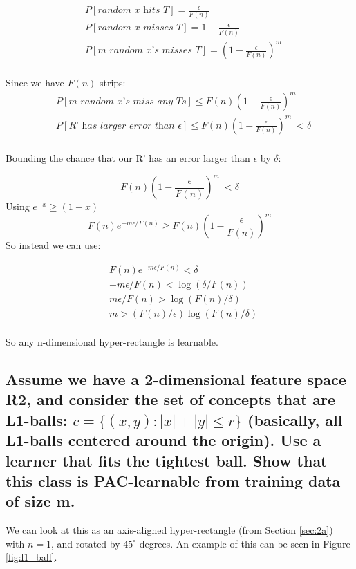 \documentclass[11pt,a4paper]{article}
\begin{document}
\begin{align*} 
    &P[\textit{random x hits T}] = \frac{\epsilon}{F(n)} \\
    &P[\textit{random x misses T}] = 1 - \frac{\epsilon}{F(n)} \\
    &P[\textit{m random x's misses T}] = (1 - \frac{\epsilon}{F(n)})^m \\
\end{align*}

Since we have $F(n)$ strips:
\begin{align*} 
    &P[\textit{m random x's miss any Ts}] \leq F(n) (1 - \frac{\epsilon}{F(n)})^m \\
    &P[\textit{R' has larger error than } \epsilon] \leq F(n) (1 - \frac{\epsilon}{F(n)})^m\ < \delta \\
\end{align*}

Bounding the chance that our R' has an error larger than $\epsilon$ by $\delta$:

\[F(n) (1 - \frac{\epsilon}{F(n)})^m\ < \delta\]
Using $e^{-x} \geq (1-x)$
\[F(n)e^{-m\epsilon / F(n)} \geq F(n)(1 - \frac{\epsilon}{F(n)})^m\]
So instead we can use:

\begin{align*} 
    &F(n)e^{-m\epsilon / F(n)} < \delta \\ 
    &-m\epsilon / F(n) < \log{(\delta / F(n))} \\
    &m\epsilon / F(n) > \log{(F(n) / \delta)} \\
    &m > (F(n) / \epsilon)\log{(F(n) / \delta)} \\
\end{align*}

So any n-dimensional hyper-rectangle is learnable.

\subsection{Assume we have a 2-dimensional feature space R2, and consider the set of concepts that are L1-balls: $c = \{(x, y) : |x| + |y| ≤ r\}$ (basically, all L1-balls centered around the origin). Use a learner that fits the tightest ball. Show that this class is PAC-learnable from training data of size m.}
\label{sec:2b}

We can look at this as an axis-aligned hyper-rectangle (from Section \ref{sec:2a}) with $n=1$, and rotated by $45^\circ$ degrees. An example of this can be seen in Figure \ref{fig:l1_ball}.
\end{document}
